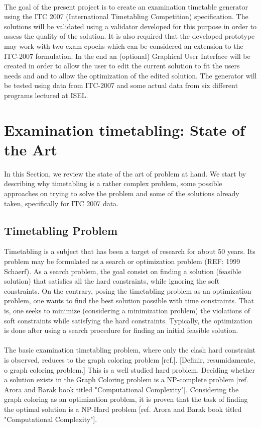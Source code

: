 \\
The goal of the present project is to create an examination timetable generator using the ITC 2007 (International Timetabling Competition) specification. The solutions will be validated using a validator developed for this purpose in order to assess the quality of the solution. It is also required that the developed prototype may work with two exam epochs which can be considered an extension to the ITC-2007 formulation. In the end an (optional) Graphical User Interface will be created in order to allow the user to edit the current solution to fit the users needs and and to allow the optimization of the edited solution. The generator will be tested using data from ITC-2007 and some actual data from six different programs lectured at ISEL.\\
\section{Examination timetabling: State of the Art}
\label{sec:sota}
In this Section, we review the state of the art of problem at hand. We start by describing why timetabling is a rather complex problem, some possible approaches on trying to solve the problem and some of the solutions already taken, specifically for ITC 2007 data.
\subsection{Timetabling Problem}
Timetabling is a subject that has been a target of research for about 50 years. Its problem may be formulated as a search or optimization problem (REF: 1999 Schaerf). As a search problem, the goal consist on finding a solution (feasible solution) that satisfies all the hard constraints, while ignoring the soft constraints. On the contrary, posing the timetabling problem as an optimization problem, one wants to find the best solution possible with time constraints. That is, one seeks to minimize (considering a minimization problem) the violations of soft constraints while satisfying the hard
constraints. Typically, the optimization is done after using a search procedure for finding an initial feasible solution.\\
\\
The basic examination timetabling problem, where only the clash hard constraint is observed, reduces to the graph coloring problem [ref.]. 
[Definir, resumidamente, o graph coloring problem.]
This is a well studied hard problem. Deciding whether a solution exists in the Graph Coloring problem is a NP-complete problem [ref. Arora and Barak book titled "Computational Complexity"]. Considering the graph coloring as an optimization problem, it is proven that the task of finding the optimal solution is a NP-Hard problem [ref. Arora and Barak book titled "Computational Complexity"].\\
\\

